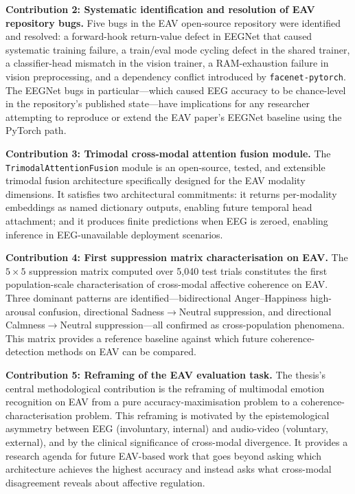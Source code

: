 \textbf{Contribution 2: Systematic identification and resolution of EAV repository bugs.} Five bugs in the EAV open-source repository were identified and resolved: a forward-hook return-value defect in EEGNet that caused systematic training failure, a train/eval mode cycling defect in the shared trainer, a classifier-head mismatch in the vision trainer, a RAM-exhaustion failure in vision preprocessing, and a dependency conflict introduced by \texttt{facenet-pytorch}. The EEGNet bugs in particular---which caused EEG accuracy to be chance-level in the repository's published state---have implications for any researcher attempting to reproduce or extend the EAV paper's EEGNet baseline using the PyTorch path.

\textbf{Contribution 3: Trimodal cross-modal attention fusion module.} The \texttt{TrimodalAttentionFusion} module is an open-source, tested, and extensible trimodal fusion architecture specifically designed for the EAV modality dimensions. It satisfies two architectural commitments: it returns per-modality embeddings as named dictionary outputs, enabling future temporal head attachment; and it produces finite predictions when EEG is zeroed, enabling inference in EEG-unavailable deployment scenarios.

\textbf{Contribution 4: First suppression matrix characterisation on EAV.} The $5\times5$ suppression matrix computed over 5,040 test trials constitutes the first population-scale characterisation of cross-modal affective coherence on EAV. Three dominant patterns are identified---bidirectional Anger--Happiness high-arousal confusion, directional Sadness$\rightarrow$Neutral suppression, and directional Calmness$\rightarrow$Neutral suppression---all confirmed as cross-population phenomena. This matrix provides a reference baseline against which future coherence-detection methods on EAV can be compared.

\textbf{Contribution 5: Reframing of the EAV evaluation task.} The thesis's central methodological contribution is the reframing of multimodal emotion recognition on EAV from a pure accuracy-maximisation problem to a coherence-characterisation problem. This reframing is motivated by the epistemological asymmetry between EEG (involuntary, internal) and audio-video (voluntary, external), and by the clinical significance of cross-modal divergence. It provides a research agenda for future EAV-based work that goes beyond asking which architecture achieves the highest accuracy and instead asks what cross-modal disagreement reveals about affective regulation.

